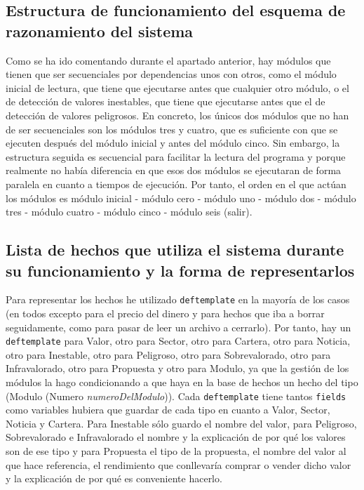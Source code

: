 \documentclass[12pt]{article}
\begin{document}
\subsection{Estructura de funcionamiento del esquema de razonamiento del sistema}
Como se ha ido comentando durante el apartado anterior, hay módulos que tienen que ser secuenciales por dependencias unos con otros, como el módulo inicial de lectura, que tiene que ejecutarse antes que cualquier otro módulo, o el de detección de valores inestables, que tiene que ejecutarse antes que el de detección de valores peligrosos. En concreto, los únicos dos módulos que no han de ser secuenciales son los módulos tres y cuatro, que es suficiente con que se ejecuten después del módulo inicial y antes del módulo cinco. Sin embargo, la estructura seguida es secuencial para facilitar la lectura del programa y porque realmente no había diferencia en que esos dos módulos se ejecutaran de forma paralela en cuanto a tiempos de ejecución. Por tanto, el orden en el que actúan los módulos es módulo inicial - módulo cero - módulo uno - módulo dos - módulo tres - módulo cuatro - módulo cinco - módulo seis (salir).

\subsection{Lista de hechos que utiliza el sistema durante su funcionamiento y la forma de representarlos}
Para representar los hechos he utilizado \texttt{deftemplate} en la mayoría de los casos (en todos excepto para el precio del dinero y para hechos que iba a borrar seguidamente, como para pasar de leer un archivo a cerrarlo). Por tanto, hay un \texttt{deftemplate} para Valor, otro para Sector, otro para Cartera, otro para Noticia, otro para Inestable, otro para Peligroso, otro para Sobrevalorado, otro para Infravalorado, otro para Propuesta y otro para Modulo, ya que la gestión de los módulos la hago condicionando a que haya en la base de hechos un hecho del tipo (Modulo (Numero \textit{numeroDelModulo})). Cada \texttt{deftemplate} tiene tantos \texttt{fields} como variables hubiera que guardar de cada tipo en cuanto a Valor, Sector, Noticia y Cartera. Para Inestable sólo guardo el nombre del valor, para Peligroso, Sobrevalorado e Infravalorado el nombre y la explicación de por qué los valores son de ese tipo y para Propuesta el tipo de la propuesta, el nombre del valor al que hace referencia, el rendimiento que conllevaría comprar o vender dicho valor y la explicación de por qué es conveniente hacerlo.
\end{document}
